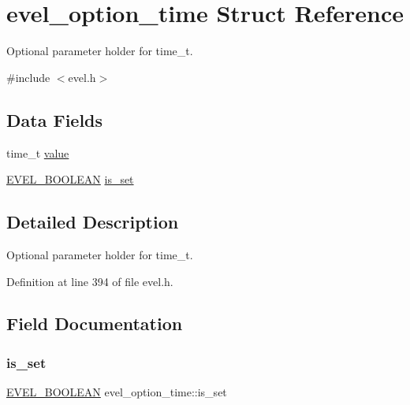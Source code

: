 \hypertarget{structevel__option__time}{}\section{evel\+\_\+option\+\_\+time Struct Reference}
\label{structevel__option__time}


Optional parameter holder for time\+\_\+t.  




{\ttfamily \#include $<$evel.\+h$>$}

\subsection*{Data Fields}
\begin{DoxyCompactItemize}
\item 
time\+\_\+t \hyperlink{structevel__option__time_a828c462ef4375392d682f18e8f6fd1b6}{value}
\item 
\hyperlink{evel_8h_af6468c18baf048a7617b485eb432197e}{E\+V\+E\+L\+\_\+\+B\+O\+O\+L\+E\+AN} \hyperlink{structevel__option__time_a22d02b6da0334ab97c641ad09e5c86f7}{is\+\_\+set}
\end{DoxyCompactItemize}


\subsection{Detailed Description}
Optional parameter holder for time\+\_\+t. 

Definition at line 394 of file evel.\+h.



\subsection{Field Documentation}
\hypertarget{structevel__option__time_a22d02b6da0334ab97c641ad09e5c86f7}{}\label{structevel__option__time_a22d02b6da0334ab97c641ad09e5c86f7} 
\subsubsection{\texorpdfstring{is\+\_\+set}{is\_set}}
{\footnotesize\ttfamily \hyperlink{evel_8h_af6468c18baf048a7617b485eb432197e}{E\+V\+E\+L\+\_\+\+B\+O\+O\+L\+E\+AN} evel\+\_\+option\+\_\+time\+::is\+\_\+set}



